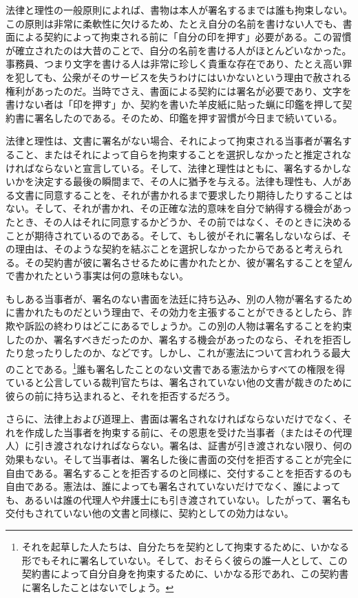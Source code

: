 \documentclass[dvipdfmx, uplatex, tate, landscape]{utbook}
\begin{document}
法律と理性の一般原則によれば、書物は本人が署名するまでは誰も拘束しない。この原則は非常に柔軟性に欠けるため、たとえ自分の名前を書けない人でも、書面による契約によって拘束される前に「自分の印を押す」必要がある。この習慣が確立されたのは大昔のことで、自分の名前を書ける人がほとんどいなかった。事務員、つまり文字を書ける人は非常に珍しく貴重な存在であり、たとえ高い罪を犯しても、公衆がそのサービスを失うわけにはいかないという理由で赦される権利があったのだ。当時でさえ、書面による契約には署名が必要であり、文字を書けない者は「印を押す」か、契約を書いた羊皮紙に貼った蝋に印鑑を押して契約書に署名したのである。そのため、印鑑を押す習慣が今日まで続いている。

法律と理性は、文書に署名がない場合、それによって拘束される当事者が署名すること、またはそれによって自らを拘束することを選択しなかったと推定されなければならないと宣言している。そして、法律と理性はともに、署名するかしないかを決定する最後の瞬間まで、その人に猶予を与える。法律も理性も、人がある文書に同意することを、それが書かれるまで要求したり期待したりすることはない。そして、それが書かれ、その正確な法的意味を自分で納得する機会があったとき、その人はそれに同意するかどうか、その前ではなく、そのときに決めることが期待されているのである。そして、もし彼がそれに署名しないならば、その理由は、そのような契約を結ぶことを選択しなかったからであると考えられる。その契約書が彼に署名させるために書かれたとか、彼が署名することを望んで書かれたという事実は何の意味もない。

もしある当事者が、署名のない書面を法廷に持ち込み、別の人物が署名するために書かれたものだという理由で、その効力を主張することができるとしたら、詐欺や訴訟の終わりはどこにあるでしょうか。この別の人物は署名することを約束したのか、署名すべきだったのか、署名する機会があったのなら、それを拒否したり怠ったりしたのか、などです。しかし、これが憲法について言われうる最大のことである。\footnote{それを起草した人たちは、自分たちを契約として拘束するために、いかなる形でもそれに署名していない。そして、おそらく彼らの誰一人として、この契約書によって自分自身を拘束するために、いかなる形であれ、この契約書に署名したことはないでしょう。}誰も署名したことのない文書である憲法からすべての権限を得ていると公言している裁判官たちは、署名されていない他の文書が裁きのために彼らの前に持ち込まれると、それを拒否するだろう。

さらに、法律上および道理上、書面は署名されなければならないだけでなく、それを作成した当事者を拘束する前に、その恩恵を受けた当事者（またはその代理人）に引き渡されなければならない。署名は、証書が引き渡されない限り、何の効果もない。そして当事者は、署名した後に書面の交付を拒否することが完全に自由である。署名することを拒否するのと同様に、交付することを拒否するのも自由である。憲法は、誰によっても署名されていないだけでなく、誰によっても、あるいは誰の代理人や弁護士にも引き渡されていない。したがって、署名も交付もされていない他の文書と同様に、契約としての効力はない。
\end{document}
